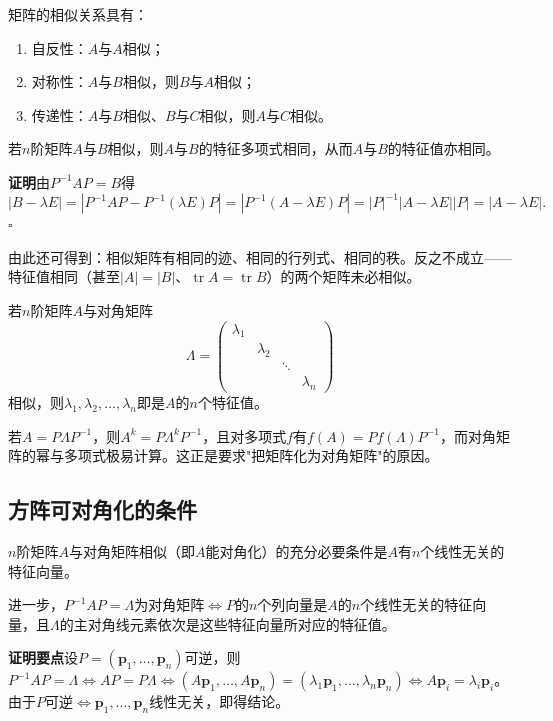 矩阵的相似关系具有：
\begin{enumerate}
    \item 自反性：$A$与$A$相似；
    \item 对称性：$A$与$B$相似，则$B$与$A$相似；
    \item 传递性：$A$与$B$相似、$B$与$C$相似，则$A$与$C$相似。
\end{enumerate}

\begin{theorem}[相似矩阵的特征多项式相同]
若$n$阶矩阵$A$与$B$相似，则$A$与$B$的特征多项式相同，从而$A$与$B$的特征值亦相同。
\end{theorem}

\textbf{证明}\quad 由$P^{-1}AP=B$得
\[
|B-\lambda E|=|P^{-1}AP-P^{-1}(\lambda E)P|=|P^{-1}(A-\lambda E)P|
=|P|^{-1}|A-\lambda E||P|=|A-\lambda E| .
\]
\hfill$\square$

由此还可得到：相似矩阵有相同的迹、相同的行列式、相同的秩。反之不成立——特征值相同（甚至$|A|=|B|$、$\operatorname{tr}A=\operatorname{tr}B$）的两个矩阵未必相似。

\begin{corollary}
若$n$阶矩阵$A$与对角矩阵
\[
\Lambda=\begin{pmatrix}\lambda_1&&&\\&\lambda_2&&\\&&\ddots&\\&&&\lambda_n\end{pmatrix}
\]
相似，则$\lambda_1,\lambda_2,\dots,\lambda_n$即是$A$的$n$个特征值。
\end{corollary}

若$A=P\Lambda P^{-1}$，则$A^{k}=P\Lambda^{k}P^{-1}$，且对多项式$f$有$f(A)=Pf(\Lambda)P^{-1}$，而对角矩阵的幂与多项式极易计算。这正是要求"把矩阵化为对角矩阵"的原因。

\subsection{方阵可对角化的条件}
\begin{theorem}[可对角化的充要条件]
$n$阶矩阵$A$与对角矩阵相似（即$A$能对角化）的充分必要条件是$A$有$n$个线性无关的特征向量。

进一步，$P^{-1}AP=\Lambda$为对角矩阵$\iff$$P$的$n$个列向量是$A$的$n$个线性无关的特征向量，且$\Lambda$的主对角线元素依次是这些特征向量所对应的特征值。
\end{theorem}

\textbf{证明要点}\quad 设$P=(\boldsymbol{p}_1,\dots,\boldsymbol{p}_n)$可逆，则$P^{-1}AP=\Lambda\iff AP=P\Lambda\iff(A\boldsymbol{p}_1,\dots,A\boldsymbol{p}_n)=(\lambda_1\boldsymbol{p}_1,\dots,\lambda_n\boldsymbol{p}_n)\iff A\boldsymbol{p}_i=\lambda_i\boldsymbol{p}_i$。由于$P$可逆$\iff$$\boldsymbol{p}_1,\dots,\boldsymbol{p}_n$线性无关，即得结论。

